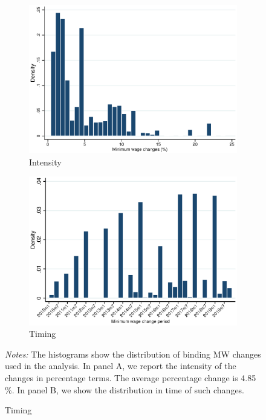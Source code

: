\begin{figure}[h!]
	\centering
	\caption{Minimum Wage Changes Distribution}
	\label{fig:d_ln_mw_dist}
	\begin{subfigure}{.49\textwidth}
		\caption{Intensity}
			\includegraphics[width = \textwidth]{../../analysis/descriptive/output/d_ln_mw_dist.eps}
	\end{subfigure}
	\begin{subfigure}{.49\textwidth}
		\caption{Timing}
		\includegraphics[width = \textwidth]{../../analysis/descriptive/output/d_ln_mw_date_dist.eps}
	\end{subfigure}
	\begin{minipage}{\textwidth} \footnotesize
		\textit{Notes:} The histograms show the distribution of binding MW changes used in the analysis. In panel A, we report the intensity of the changes in percentage terms. The average percentage change is 4.85 \%.  In panel B, we show the distribution in time of such changes. 
	\end{minipage}
	\end{figure}


